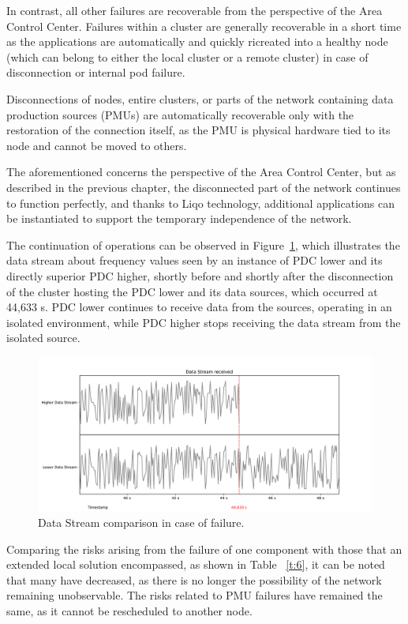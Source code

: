 In contrast, all other failures are recoverable from the perspective of the Area Control Center. Failures within a cluster are generally recoverable in a short time as the applications are automatically and quickly ricreated into a healthy node (which can belong to either the local cluster or a remote cluster) in case of disconnection or internal pod failure. 

Disconnections of nodes, entire clusters, or parts of the network containing data production sources (PMUs) are automatically recoverable only with the restoration of the connection itself, as the PMU is physical hardware tied to its node and cannot be moved to others.

The aforementioned concerns the perspective of the Area Control Center, but as described in the previous chapter, the disconnected part of the network continues to function perfectly, and thanks to Liqo technology, additional applications can be instantiated to support the temporary independence of the network.

The continuation of operations can be observed in Figure~\ref{fig:stream}, which illustrates the data stream about frequency values seen by an instance of PDC lower and its directly superior PDC higher, shortly before and shortly after the disconnection of the cluster hosting the PDC lower and its data sources, which occurred at 44,633 s. PDC lower continues to receive data from the sources, operating in an isolated environment, while PDC higher stops receiving the data stream from the isolated source. 

\begin{figure}[ht]\centering
\includegraphics[scale=0.5]{Pictures/data-stream}
\caption{Data Stream comparison in case of failure.}\label{fig:stream}
\end{figure}

Comparing the risks arising from the failure of one component with those that an extended local solution encompassed, as shown in Table ~\ref{t:6}, it can be noted that many have decreased, as there is no longer the possibility of the network remaining unobservable. The risks related to PMU failures have remained the same, as it cannot be rescheduled to another node.

